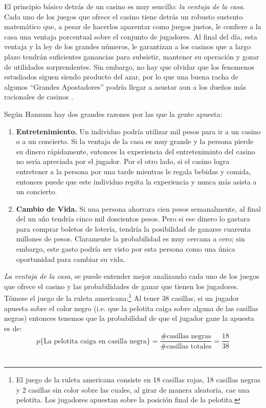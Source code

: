 El principio básico detrás de un casino es muy sencillo: \emph{la ventaja de la casa}. Cada uno de los juegos que ofrece el casino tiene detrás un robusto sustento matemático que, a pesar de hacerlos aparentar como juegos justos, le confiere a la casa una ventaja porcentual sobre el conjunto de jugadores. Al final del día, esta ventaja y la ley de los grandes números, le garantizan a los casinos que a largo plazo tendrán suficientes ganancias para subsistir, mantener su operación y gozar de utilidades sorprendentes. Sin embargo, no hay que olvidar que los fenomenos estudiados siguen siendo producto del azar, por lo que una buena racha de algunos ``Grandes Apostadores'' podría llegar a asustar aun a los dueños  más racionales de casinos \cite{hannum2005practical}.



Según Hannum \cite{hannum2005practical} hay dos grandes razones por las que la gente apuesta:

\begin{enumerate}
	\item \textbf{Entretenimiento.} Un individuo podría utilizar mil pesos para ir a un casino o a un concierto. Si la ventaja de la casa es muy grande y la persona pierde su dinero rápidamente, entonces la experiencia del entreteniminto del casino no sería apreciada por el jugador. Por el otro lado, si el casino logra entretener a la persona por una tarde mientras le regala bebidas y comida, entonces puede que este individuo repita la experiencia y nunca más asista a un concierto.
	\item \textbf{Cambio de Vida.} Si una persona ahorrara cien pesos semanalmente, al final del un año tendría cinco mil doscientos pesos. Pero si ese dinero lo gastara para comprar boletos de lotería, tendría la posibilidad de ganarse cuarenta millones de pesos. Claramente la probabilidad es muy cercana a cero; sin embargo, este gasto podría ser visto por esta persona como una única oportunidad para cambiar su vida.

\end{enumerate}

\emph{La ventaja de la casa}, se puede entender mejor analizando cada uno de los juegos que ofrece el casino y las probabilidades de ganar que tienen los jugadores. Tómese el juego de la ruleta americana:\footnote{El juego de la ruleta americana consiste en 18 casillas rojas, 18 casillas negras y 2 casillas sin color sobre las cuales, al girar de manera aleatoria, cae una pelotita. Los jugadores apuestan sobre la posición final de la pelotita.}
Al tener $38$ casillas, si un jugador apuesta sobre el color negro (i.e. que la pelotita caiga sobre alguna de las casillas negras) entonces tenemos que la probabilidad de que el jugador gane la apuesta es de:\\
\[p\{\text{La pelotita caiga en casilla negra}\} = \frac{\text{\# casillas negras}}{ \text{\# casillas totales}}  = \frac{18}{38}\]\\

